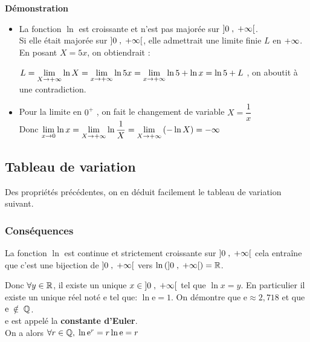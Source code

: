 \textbf{Démonstration}
\begin{itemize}
\item La fonction  $ \ln  $ est croissante et  n'est pas   majorée sur  $ \left]0 \;,\; +\infty\right[ $.\\
 Si elle était majorée sur $ \left]0 \;,\; +\infty\right[ $, elle admettrait une limite finie $L$ en
$ +\infty $. En posant $X = 5x$, on obtiendrait :

$L= \displaystyle\lim_{X \to +\infty} \ln X = \displaystyle\lim_{x \to +\infty} \ln 5x = \displaystyle\lim_{x \to +\infty} \ln 5 + \ln x = \ln 5 + L$ , on aboutit à une contradiction.
\item  Pour la limite en $ 0^{+} $ , on fait le changement de variable $ X=\dfrac{1}{x} $\\
Donc $ \displaystyle\lim_{x \to 0}\ln x=\displaystyle\lim_{X \to +\infty}\ln \dfrac{1}{X}=\displaystyle\lim_{X \to  +\infty}\left(-\ln X\right)=-\infty $
\end{itemize}


\subsection*{Tableau de variation }
Des propriétés précédentes, on en déduit facilement le tableau de variation suivant.

\begin{center}

\end{center}



\subsubsection*{Conséquences}
La fonction $ \ln  $  est continue et strictement croissante sur $ \left]0 \;,\; +\infty\right[ $  cela entraîne que c'est une bijection de $ \left]0 \;,\; +\infty\right[ $  vers $ \ln \left(  \left]0 \;,\; +\infty\right[ \right)=\mathbb{R} $.

Donc $ \forall y \in \mathbb{R} $,  il existe un unique $ x\in \left]0 \;,\; +\infty\right[ $ tel que $ \ln x=y. $  En particulier il existe un unique réel noté $ \mathrm{e} $ tel que:  $\ln \mathrm{e}=1 $.
On démontre que $ \mathrm{e}\approx 2,718 $    et que  $  \mathrm{e}\;\notin\; \mathbb{Q}$.\\  $ \mathrm{e }$ est appelé la  \textbf{ constante d'Euler}.\\
On a alors  $ \forall r \in \mathbb{Q}, \; \ln \mathrm{e}^{r}=r\ln \mathrm{e}=r $


